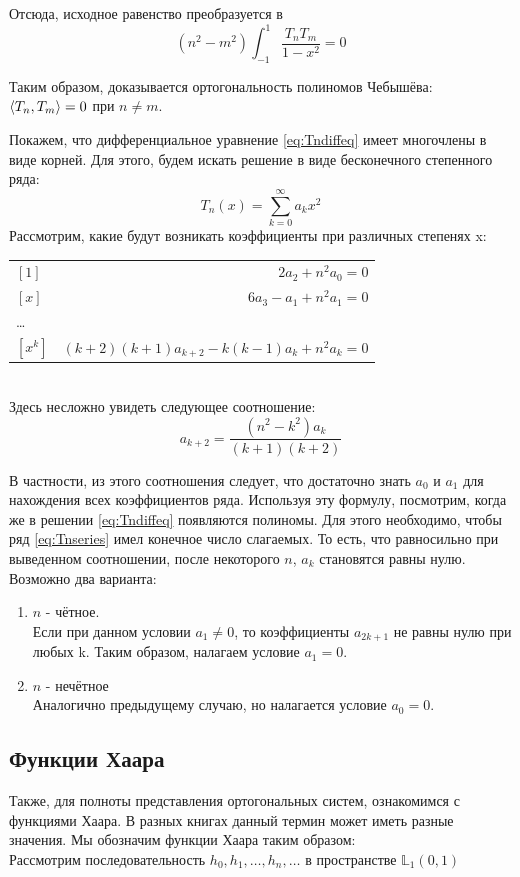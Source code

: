 \documentclass[12pt]{article}
\begin{document}
	Отсюда, исходное равенство преобразуется в
	$$(n^2 - m^2) \int_{-1}^{1} \frac{T_n T_m}{1-x^2} = 0$$
	
	Таким образом, доказывается ортогональность полиномов Чебышёва: $\left\langle T_n, T_m \right\rangle = 0$ при $n \neq m$.
	
	Покажем, что дифференциальное уравнение \eqref{eq:Tndiffeq} имеет многочлены в виде корней. Для этого, будем искать
	решение в виде бесконечного степенного ряда: 
	\begin{equation} \label{eq:Tnseries}
		T_n(x) = \sum_{k=0}^{\infty} a_k x^2
	\end{equation}
	Рассмотрим, какие будут возникать коэффициенты при различных степенях x: \\
	\begin{tabular}{l r}
		$[1]$ & $ 2a_2 + n^2 a_0 = 0 $ \\
		$[x]$ & $ 6a_3 - a_1 + n^2a_1 = 0 $ \\
		\dots \\
		$[x^k]$ & $ (k+2)(k+1) a_{k+2} - k(k-1) a_k + n^2 a_k = 0 $
	\end{tabular} \\
	Здесь несложно увидеть следующее соотношение:
	$$ a_{k+2} = \frac{(n^2 - k^2) a_k}{(k+1)(k+2)}$$
	
	В частности, из этого соотношения следует, что достаточно знать $a_0$ и $a_1$ для нахождения всех коэффициентов ряда.
	Используя эту формулу, посмотрим, когда же в решении \eqref{eq:Tndiffeq} появляются полиномы. Для этого необходимо, 
	чтобы ряд \eqref{eq:Tnseries} имел конечное число слагаемых. То есть, что равносильно при выведенном соотношении, 
	после некоторого $n$, $a_k$ становятся равны нулю. Возможно два варианта:
	\begin{enumerate}
		\item $n$ - чётное. \\
		Если при данном условии $a_1 \neq 0$, то коэффициенты $a_{2k+1}$ не равны нулю при любых k. Таким образом, налагаем
		условие $a_1 = 0$.
		\item $n$ - нечётное \\
		Аналогично предыдущему случаю, но налагается условие $a_0 = 0$.
	\end{enumerate}
	
	\subsection{Функции Хаара}
	
	Также, для полноты представления ортогональных систем, ознакомимся с функциями Хаара. В разных книгах данный термин
	может иметь разные значения. Мы обозначим функции Хаара таким образом: \\
	Рассмотрим последовательность $h_0, h_1, \dots, h_n, \dots$ в пространстве $\mathbb{L}_1(0, 1)$
	
\end{document}
